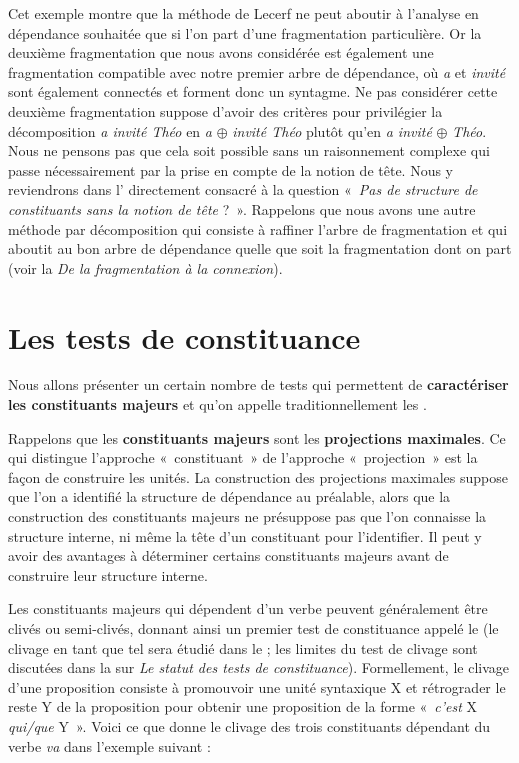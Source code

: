 {    Cet exemple montre que la méthode de Lecerf ne peut aboutir à l’analyse en dépendance souhaitée que si l’on part d’une fragmentation particulière. Or la deuxième fragmentation que nous avons considérée est également une fragmentation compatible avec notre premier arbre de dépendance, où \textit{a} et \textit{invité} sont également connectés et forment donc un syntagme. Ne pas considérer cette deuxième fragmentation suppose d’avoir des critères pour privilégier la décomposition \textit{a invité Théo} en \textit{a} \textrm{${\oplus}$} \textit{invité Théo} plutôt qu’en \textit{a invité} \textrm{${\oplus}$} \textit{Théo}. Nous ne pensons pas que cela soit possible sans un raisonnement complexe qui passe nécessairement par la prise en compte de la notion de tête. Nous y reviendrons dans l’ directement consacré à la question «~\textit{Pas de structure de constituants sans la notion de tête} ?~». Rappelons que nous avons une autre méthode par décomposition qui consiste à raffiner l’arbre de fragmentation et qui aboutit au bon arbre de dépendance quelle que soit la fragmentation dont on part (voir la  \textit{De la fragmentation à la connexion}).
}
\section{Les tests de constituance}\label{sec:3.4.10}

Nous allons présenter un certain nombre de tests qui permettent de \textbf{caractériser les constituants majeurs} et qu’on appelle traditionnellement les .

Rappelons que les \textbf{constituants majeurs} sont les \textbf{projections maximales}. Ce qui distingue l’approche «~constituant~» de l’approche «~projection~» est la façon de construire les unités. La construction des projections maximales suppose que l’on a identifié la structure de dépendance au préalable, alors que la construction des constituants majeurs ne présuppose pas que l’on connaisse la structure interne, ni même la tête d’un constituant pour l’identifier. Il peut y avoir des avantages à déterminer certains constituants majeurs avant de construire leur structure interne.

Les constituants majeurs qui dépendent d’un verbe peuvent généralement être clivés ou semi-clivés, donnant ainsi un premier test de constituance appelé le  (le clivage en tant que tel sera étudié dans le  ; les limites du test de clivage sont discutées dans la  sur \textit{Le statut des tests de constituance}). Formellement, le clivage d'une proposition consiste à promouvoir une unité syntaxique X et rétrograder le reste Y de la proposition pour obtenir une proposition de la forme «~\textit{c'est} X \textit{qui/que}
Y~».
Voici ce que donne le clivage des trois constituants dépendant du verbe \textit{va} dans l’exemple suivant :

